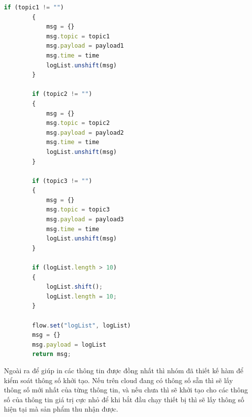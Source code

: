 \documentclass{report}
\begin{document}
\begin{enumerate}
\begin{lstlisting}[language=JavaScript, caption={function of control log list}]
        if (topic1 != "")
        {
            msg = {}
            msg.topic = topic1
            msg.payload = payload1
            msg.time = time
            logList.unshift(msg)
        }

        if (topic2 != "") 
        {
            msg = {}
            msg.topic = topic2
            msg.payload = payload2
            msg.time = time
            logList.unshift(msg)
        }

        if (topic3 != "") 
        {
            msg = {}
            msg.topic = topic3
            msg.payload = payload3
            msg.time = time
            logList.unshift(msg)
        }

        if (logList.length > 10) 
        {
            logList.shift();
            logList.length = 10;
        }

        flow.set("logList", logList)
        msg = {}
        msg.payload = logList
        return msg;
    \end{lstlisting}

    Ngoài ra để  giúp in các thông tin được đồng nhất thì nhóm đã thiết kế  hàm để kiểm soát thông số  khởi tạo. Nếu trên cloud đang có thông số sẵn thì sẽ lấy thông số mới nhất của từng thông tin, và nếu chưa thì sẽ khởi tạo cho các thông số của thông tin giá trị cực nhỏ để khi bắt đầu chạy thiết bị thì sẽ lấy thông số  hiện tại mà sản phẩm thu nhận được.
\end{enumerate}

\newpage
\end{document}
